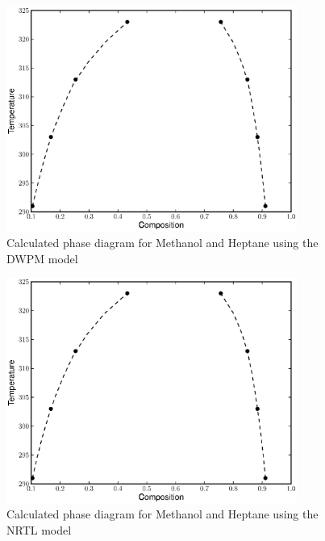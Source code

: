 \begin{figure}[hp]
\centering
\includegraphics[width = 0.85\textwidth]{Results_Parts/BinaryParams/methanol-heptane/DWPM/PhaseDiagram.eps}
\caption{Calculated phase diagram for Methanol and Heptane using the DWPM model} \label{DWPMmethanol-heptane}
\end{figure}

\begin{figure}[hp]
\centering
\includegraphics[width = 0.85\textwidth]{Results_Parts/BinaryParams/methanol-heptane/NRTL/PhaseDiagram.eps}
\caption{Calculated phase diagram for Methanol and Heptane using the NRTL model} \label{NRTLmethanol-heptane}
\end{figure}	

